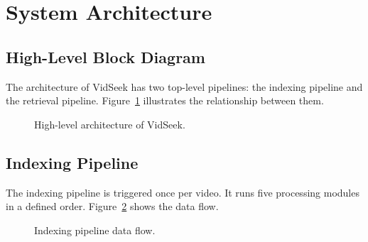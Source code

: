 \documentclass[12pt, a4paper]{report}
\begin{document}
\section{System Architecture}

\subsection{High-Level Block Diagram}

The architecture of VidSeek has two top-level pipelines: the indexing
pipeline and the retrieval pipeline. Figure~\ref{fig:arch_overview}
illustrates the relationship between them.

\begin{figure}[H]
  \centering
  \caption{High-level architecture of VidSeek.}
  \label{fig:arch_overview}
\end{figure}

\subsection{Indexing Pipeline}

The indexing pipeline is triggered once per video. It runs five processing
modules in a defined order. Figure~\ref{fig:indexing_pipeline} shows the
data flow.

\begin{figure}[H]
  \centering
  \caption{Indexing pipeline data flow.}
  \label{fig:indexing_pipeline}
\end{figure}
\end{document}
